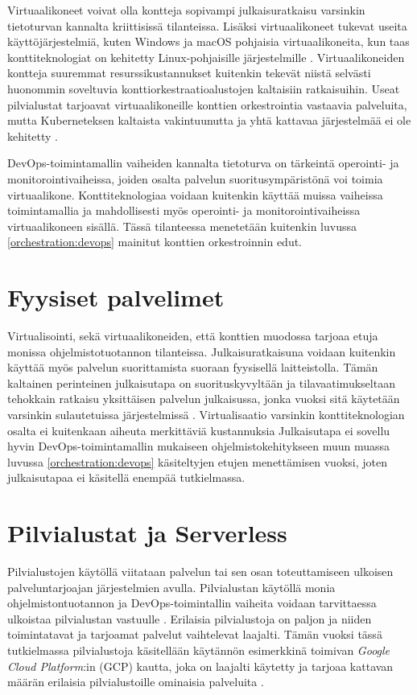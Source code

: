 Virtuaalikoneet voivat olla kontteja sopivampi julkaisuratkaisu varsinkin tietoturvan kannalta kriittisissä tilanteissa.
Lisäksi virtuaalikoneet tukevat useita käyttöjärjestelmiä, kuten Windows ja macOS pohjaisia virtuaalikoneita, kun taas konttiteknologiat on kehitetty Linux-pohjaisille järjestelmille \cite{}.
Virtuaalikoneiden kontteja suuremmat resurssikustannukset kuitenkin tekevät niistä selvästi huonommin soveltuvia konttiorkestraatioalustojen kaltaisiin ratkaisuihin.
Useat pilvialustat tarjoavat virtuaalikoneille konttien orkestrointia vastaavia palveluita, mutta Kuberneteksen kaltaista vakintuunutta ja yhtä kattavaa järjestelmää ei ole kehitetty \cite{}.

DevOps-toimintamallin vaiheiden kannalta tietoturva on tärkeintä operointi- ja monitorointivaiheissa, joiden osalta palvelun suoritusympäristönä voi toimia virtuaalikone.
Konttiteknologiaa voidaan kuitenkin käyttää muissa vaiheissa toimintamallia ja mahdollisesti myös operointi- ja monitorointivaiheissa virtuaalikoneen sisällä.
Tässä tilanteessa menetetään kuitenkin luvussa \ref{orchestration:devops} mainitut konttien orkestroinnin edut.

\section{Fyysiset palvelimet}

Virtualisointi, sekä virtuaalikoneiden, että konttien muodossa tarjoaa etuja monissa ohjelmistotuotannon tilanteissa.
Julkaisuratkaisuna voidaan kuitenkin käyttää myös palvelun suorittamista suoraan fyysisellä laitteistolla.
Tämän kaltainen perinteinen julkaisutapa on suorituskyvyltään ja tilavaatimukseltaan tehokkain ratkaisu yksittäisen palvelun julkaisussa, jonka vuoksi sitä käytetään varsinkin sulautetuissa järjestelmissä \cite{Heiser08}.
Virtualisaatio varsinkin konttiteknologian osalta ei kuitenkaan aiheuta merkittäviä kustannuksia \cite{torrez19}
Julkaisutapa ei sovellu hyvin DevOps-toimintamallin mukaiseen ohjelmistokehitykseen muun muassa luvussa \ref{orchestration:devops} käsiteltyjen etujen menettämisen vuoksi, joten julkaisutapaa ei käsitellä enempää tutkielmassa.

\section{Pilvialustat ja Serverless}

Pilvialustojen käytöllä viitataan palvelun tai sen osan toteuttamiseen ulkoisen palveluntarjoajan järjestelmien avulla.
Pilvialustan käytöllä monia ohjelmistontuotannon ja DevOps-toimintallin vaiheita voidaan tarvittaessa ulkoistaa pilvialustan vastuulle \cite{tomarchio20}.
Erilaisia pilvialustoja on paljon ja niiden toimintatavat ja tarjoamat palvelut vaihtelevat laajalti.
Tämän vuoksi tässä tutkielmassa pilvialustoja käsitellään käytännön esimerkkinä toimivan \textit{Google Cloud Platform}:in (GCP) kautta, joka on laajalti käytetty ja tarjoaa kattavan määrän erilaisia pilvialustoille ominaisia palveluita \cite{ahuja20}.


